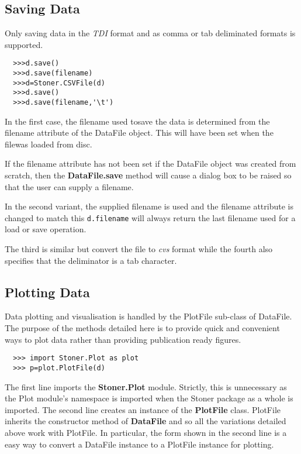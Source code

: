 \documentclass[a4paper,11pt]{scrartcl}
\begin{document}
\subsection{Saving Data}\label{save}

Only saving data in the \textit{TDI} format and as comma or tab deliminated formats is supported.


\begin{verbatim}
  >>>d.save()
  >>>d.save(filename)
  >>>d=Stoner.CSVFile(d)
  >>>d.save()
  >>>d.save(filename,'\t')
\end{verbatim}

In the first case, the filename used tosave the data is determined from the
filename attribute of the DataFile object. This will have been set when the
filewas loaded from disc.

If the filename attribute has not been set \eg if the DataFile object was
created from scratch, then the \textbf{DataFile.save} method will cause a dialog
box to be raised so that the user can supply a filename.

In the second variant, the supplied filename is used and the filename attribute
is changed to match this \ie \verb#d.filename# will always return the last
filename used for a load or save operation.

The third is similar but convert the file to \textit{cvs} format while the fourth also specifies that the deliminator is a tab character.

\subsection{Plotting Data}

Data plotting and visualisation is handled by the PlotFile sub-class of DataFile. The purpose of the methods detailed here is to provide quick and convenient ways to plot data rather than providing publication ready figures.

\begin{verbatim}
  >>> import Stoner.Plot as plot
  >>> p=plot.PlotFile(d)
\end{verbatim}

The first line imports the \textbf{Stoner.Plot} module. Strictly, this is unnecessary as the Plot module's namespace is imported when the Stoner package as a whole is imported. The second line creates an instance of the \textbf{PlotFile} class. PlotFile inherits the constructor method of \textbf{DataFile} and so all the variations detailed above work with PlotFile. In particular, the form shown in the second line is a easy way to convert a DataFile instance to a PlotFile instance for plotting.
\end{document}
